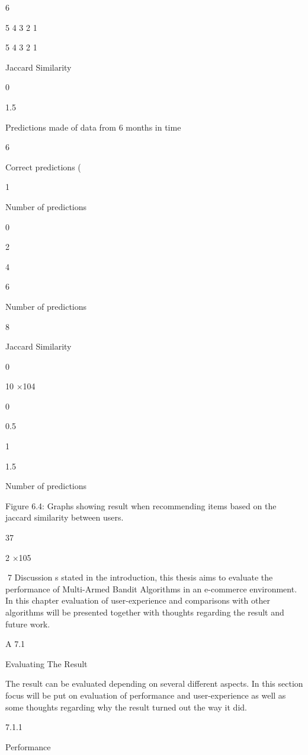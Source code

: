 6

5
4
3
2
1

5
4
3
2
1

Jaccard Similarity

0

1.5

Predictions made of data from 6 months in time

6

Correct predictions (%

1

Number of predictions

0

2

4

6

Number of predictions

8

Jaccard Similarity

0

10
×104

0

0.5

1

1.5

Number of predictions

Figure 6.4: Graphs showing result when recommending items based on the jaccard similarity between users.

37

2
×105

7
Discussion
s stated in the introduction, this thesis aims to evaluate the performance
of Multi-Armed Bandit Algorithms in an e-commerce environment. In this
chapter evaluation of user-experience and comparisons with other algorithms
will be presented together with thoughts regarding the result and future work.

A
7.1

Evaluating The Result

The result can be evaluated depending on several different aspects. In this section focus
will be put on evaluation of performance and user-experience as well as some thoughts
regarding why the result turned out the way it did.

7.1.1

Performance

